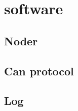 

%
%
%
%
%

%

\part{software}
\chapter{Noder}
    
\chapter{Can protocol}
	
\chapter{Log}
	

	
	\label{bibtex}

%	


	\label{sidste_side}

